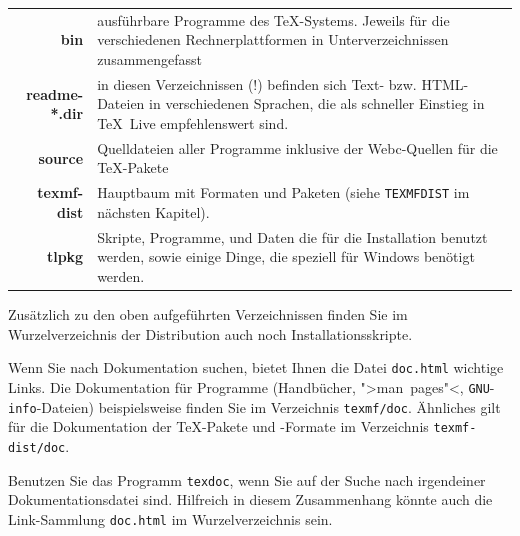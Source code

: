 \documentclass[12pt,ngerman,a4paper,fullparskip]{scrreprt}
\newcommand{\TL}{\TeX\ Live\xspace}
\newcommand{\acro}[1]{\texttt{#1}}
\newcommand{\cmdname}[1]{\texttt{#1}}
\newcommand{\OnCD}[1]{\texttt{#1}}
\newcommand{\filename}[1]{\texttt{#1}}
\begin{document}
\begin{center}
\begin{tabular}{rp{}}
\textbf{bin}        &  ausführbare Programme des \TeX-Systems. Jeweils für die verschiedenen Rechnerplattformen
              in Unterverzeichnissen zusammengefasst\\
\textbf{readme-*.dir} & in diesen Verzeichnissen (!) befinden sich Text- bzw. HTML-Dateien
              in verschiedenen Sprachen, die als schneller
              Einstieg in \TL empfehlenswert sind.\\
\textbf{source}     &  Quelldateien aller Programme inklusive der
              Webc-Quellen für die \TeX-Pakete\\
\textbf{texmf-dist} &  Hauptbaum mit Formaten und Paketen (siehe \texttt{TEXMFDIST} im nächsten Kapitel).\\
\textbf{tlpkg}      &  Skripte, Programme, und Daten die für die Installation benutzt werden, sowie einige Dinge, die speziell für Windows benötigt werden.

\end{tabular}
\end{center}

Zusätzlich zu den oben aufgeführten Verzeichnissen finden Sie
im Wurzelverzeichnis der Distribution auch noch Installationsskripte.

Wenn Sie nach Dokumentation suchen, bietet Ihnen die Datei \OnCD{doc.html} wichtige Links.
Die Dokumentation für Programme (Handbücher, ">man~pages"<, \acro{GNU}-\acro{info}-Dateien) beispielsweise finden Sie 
im Verzeichnis \OnCD{texmf/doc}. Ähnliches 
gilt für die Dokumentation der \TeX-Pakete und -Formate im Verzeichnis \OnCD{texmf-dist/doc}. 

Benutzen Sie das Programm \cmdname{texdoc}, wenn Sie auf der Suche nach irgendeiner 
Dokumentationsdatei sind. Hilfreich in diesem Zusammenhang könnte auch die Link-Sammlung \filename{doc.html} im Wurzelverzeichnis sein.
\end{document}
